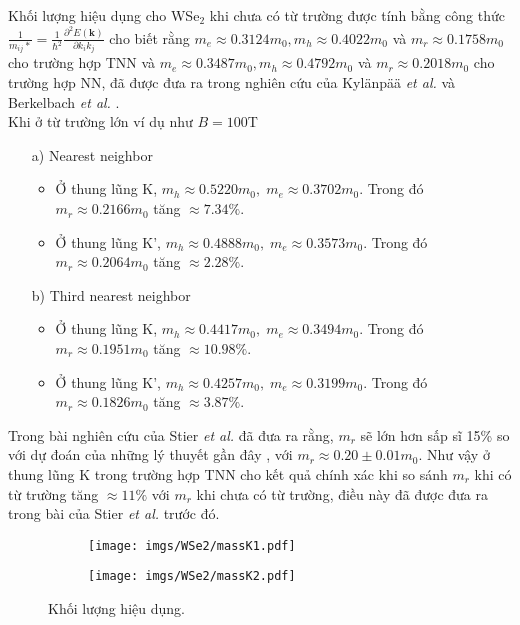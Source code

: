 \documentclass{article}
\begin{document}
Khối lượng hiệu dụng cho WSe$_{2}$ khi chưa có từ trường được tính bằng công thức $\frac{1}{m_{ij}*} =\frac{1}{\hbar^{2}} \frac{\partial^{2} E(\mathbf{k})}{\partial k_{i} k_{j}}$ cho biết rằng $m_{e} \approx 0.3124 m_{0}, m_{h} \approx 0.4022 m_{0}$ và $m_{r} \approx 0.1758 m_{0}$ cho trường hợp TNN và $m_{e} \approx 0.3487 m_{0}, m_{h} \approx 0.4792 m_{0}$ và $m_{r} \approx 0.2018 m_{0}$ cho trường hợp NN, đã được đưa ra trong nghiên cứu của Kyl\"{a}np\"{a}\"{a} \textit{et al.} và Berkelbach \textit{et al.} \cite{kylanpaa2015,berkelbach2013}. \\
Khi ở từ trường lớn ví dụ như $B = 100 $T
\begin{itemize}
	\item[a)] Nearest neighbor
	\begin{itemize}
		\item Ở thung lũng K, $m_{h} \approx 0.5220 m_{0},\; m_{e} \approx 0.3702 m_{0}$. 
		Trong đó $m_{r} \approx 0.2166 m_{0}$ tăng $\approx 7.34\%$.
		
		\item Ở thung lũng K', $m_{h} \approx 0.4888 m_{0},\; m_{e} \approx 0.3573 m_{0}$. 
		Trong đó $m_{r} \approx 0.2064 m_{0}$ tăng $\approx 2.28\%$.
	\end{itemize}
	\item[b)] Third nearest neighbor
	\begin{itemize}
		\item Ở thung lũng K, $m_{h} \approx 0.4417 m_{0},\; m_{e} \approx 0.3494 m_{0}$. 
		Trong đó $m_{r} \approx 0.1951 m_{0}$ tăng $\approx 10.98\%$.
		
		\item Ở thung lũng K', $m_{h} \approx 0.4257 m_{0},\; m_{e} \approx 0.3199 m_{0}$. 
		Trong đó $m_{r} \approx 0.1826 m_{0}$ tăng $\approx 3.87\%$.
	\end{itemize}
\end{itemize}
Trong bài nghiên cứu của Stier \textit{et al.} \cite{stier2018} đã đưa ra rằng, $m_{r}$ sẽ lớn hơn sấp sĩ 15\% so với dự đoán của những lý thuyết gần đây \cite{berkelbach2013,kylanpaa2015}, với $m_{r} \approx 0.20 \pm 0.01 m_{0}$.  Như vậy ở thung lũng K trong trường hợp TNN cho kết quả chính xác khi so sánh $m_{r}$ khi có từ trường tăng $\approx 11\%$ với $m_{r}$ khi chưa có từ trường, điều này đã được đưa ra trong bài của Stier \textit{et al.}\cite{stier2018} trước đó.
\begin{figure}[htb]
	\begin{subfigure}{0.495\textwidth}
		\centering
		\texttt{[image: imgs/WSe2/massK1.pdf]}
	\end{subfigure}
	\begin{subfigure}{0.495\textwidth}
		\centering
		\texttt{[image: imgs/WSe2/massK2.pdf]}
	\end{subfigure}
	\caption{Khối lượng hiệu dụng.}
\end{figure}
\end{document}
